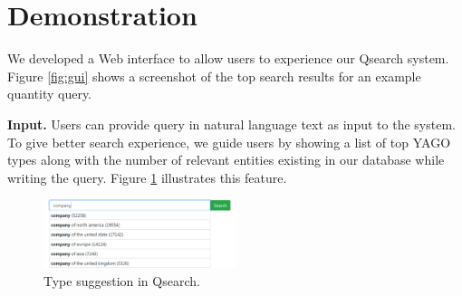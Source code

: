 
\section{Demonstration}
\label{sec:demo}

We developed a Web interface to allow users to experience our Qsearch system. Figure \ref{fig:gui} shows a screenshot of the top search results for an example quantity query.





\noindent \textbf{Input.} Users can provide query in natural language text as input to the system. 
To give better search experience, we guide users by showing a list of top YAGO types along with the number of relevant entities existing in our database while writing the query. Figure \ref{fig:type} illustrates this feature.

\begin{figure}[t]
\centering
\includegraphics[width=0.5\textwidth]{figures/new/suggest.png}
\caption{Type suggestion in Qsearch.}
\label{fig:type}
\vspace{-1em}
\end{figure}


